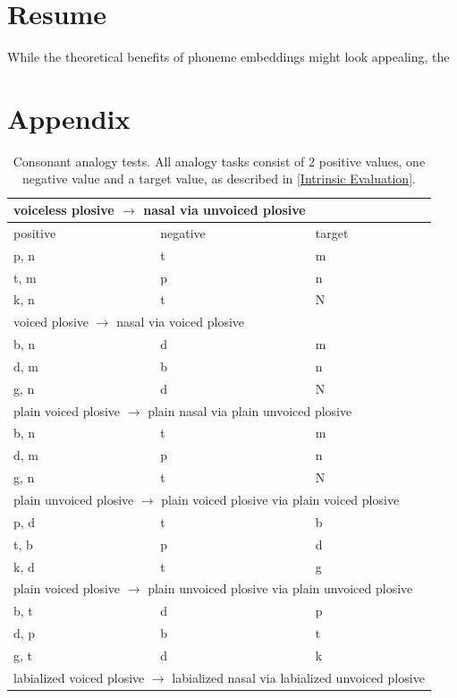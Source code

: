 \documentclass[11pt]{article}
\begin{document}
\section{Resume}
While the theoretical benefits of phoneme embeddings might look appealing, the 


 
\section{Appendix}
\begin{table}[h]
\centering
\tiny
\caption{Consonant analogy tests. All analogy tasks consist of 2 positive values, one negative value and a target value, as described in \ref{Intrinsic Evaluation}.}
\begin{tabular}{ l | l | l }
\hline \multicolumn{3}{l}{voiceless plosive $\rightarrow$ nasal via unvoiced plosive}\\  \hline
positive & negative & target \\ \hline
p, n & t & m \\
t, m & p & n \\
k, n & t & N \\ 
 \hline \multicolumn{3}{l}{voiced plosive $\rightarrow$ nasal via voiced plosive}\\  \hline
b, n & d & m \\
d, m & b & n \\
g, n & d & N \\
 \hline \multicolumn{3}{l}{plain voiced plosive $\rightarrow$ plain nasal via plain unvoiced plosive}\\  \hline
b, n & t & m \\
d, m & p & n \\
g, n & t & N \\
 \hline \multicolumn{3}{l}{plain unvoiced plosive $\rightarrow$ plain voiced plosive via plain voiced plosive}\\  \hline
p, d & t & b \\
t, b & p & d \\
k, d & t & g \\
 \hline \multicolumn{3}{l}{plain voiced plosive $\rightarrow$ plain unvoiced plosive via plain unvoiced plosive}\\  \hline
b, t & d & p \\
d, p & b & t \\
g, t & d & k \\
 \hline \multicolumn{3}{l}{labialized voiced plosive $\rightarrow$  labialized nasal via labialized unvoiced plosive}\\  \hline

\end{tabular}
\end{table}
\end{document}
